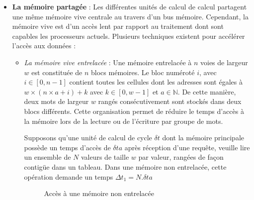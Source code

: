 \documentclass[fleqn,11pt]{article}
\begin{document}
\begin{itemize}
\item \textbf{La mémoire partagée} : Les différentes unités de calcul de calcul partagent une même mémoire vive centrale au travers d'un bus mémoire. Cependant, la mémoire vive est d'un accès lent par rapport au traitement dont sont capables les processeurs actuels. Plusieurs techniques existent pour accélérer l'accès aux données :
  \begin{itemize}
  \item \textsl{La mémoire vive entrelacée} : Une mémoire entrelacée à $n$ voies de largeur $w$ est constituée de $n$ blocs mémoires. 
  Le bloc numéroté $i$, avec $i\in \left[0, n-1\right]$ contient toutes les cellules dont les adresses sont égales à 
  $w\times ( n \times a + i ) +  k $ avec $k\in \left[0,w-1\right]$ et $a\in \mathds{N}$. 
  De cette manière, deux mots de largeur $w$ rangés consécutivement sont stockés dans deux blocs différents. 
  Cette organisation permet de réduire  le temps d'accès à la mémoire lors de la lecture ou de l'écriture par groupe de mots.

Supposons qu'une unité de calcul de cycle $\delta t$ dont la mémoire principale possède un temps d'accès de $\delta ta$  après réception d'une requête, veuille lire un ensemble de $N$ valeurs de taille $w$ par valeur, rangées de façon contigüe dans un tableau. Dans une mémoire non entrelacée, cette opération demande un temps $\Delta t_{1} = N.\delta ta$

\begin{figure}[h]
\begin{center}
\end{center}
\caption{Accès à une mémoire non entrelacée}
\end{figure}


\end{itemize}
\end{itemize}
\end{document}
